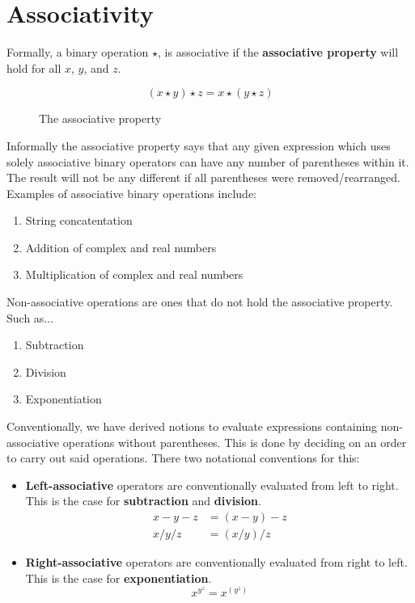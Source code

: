 \section{Associativity}

Formally, a binary operation $\star$, is associative if the \textbf{associative property} will hold for all $x$, $y$, and $z$.

\begin{figure}[H]
    \begin{equation}
        (x \star y) \star z = x \star (y \star z)
        \nonumber
    \end{equation}
    \caption{\label{fig:4.1}The associative property}
\end{figure}

Informally the associative property says that any given expression which uses solely associative binary operators can have any number of parentheses within it. The result will not be any different if all parentheses were removed/rearranged. Examples of associative binary operations include:

\begin{enumerate}
    \item String concatentation
    \item Addition of complex and real numbers
    \item Multiplication of complex and real numbers
\end{enumerate}

Non-associative operations are ones that do not hold the associative property. Such as...

\begin{enumerate}
    \item Subtraction
    \item Division
    \item Exponentiation
\end{enumerate}

Conventionally, we have derived notions to evaluate expressions containing non-associative operations without parentheses. This is done by deciding on an order to carry out said operations. There two notational conventions for this:

\begin{itemize}
    \item \textbf{Left-associative} operators are conventionally evaluated from left to right. This is the case for \textbf{subtraction} and \textbf{division}.
    \begin{equation}
        \begin{split}
            x - y - z &= (x - y) - z\\
            x / y / z &= (x / y) / z
        \end{split}
        \nonumber
    \end{equation}
    \item \textbf{Right-associative} operators are conventionally evaluated from right to left. This is the case for \textbf{exponentiation}.
    \begin{equation}
        x^{y^z} = x^{(y^z)}
        \nonumber
    \end{equation}
\end{itemize}

